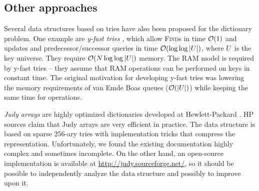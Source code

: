 \subsection{Other approaches}
Several data structures based on tries have also been proposed for the
dictionary problem. One example are \emph{y-fast tries} \cite{y-fast},
which allow \textsc{Find}s in time $\mathcal{O}(1)$ and updates and predecessor/successor
queries in time $\mathcal{O}(\log\log |U|)$, where $U$~is the key universe. They require
$\mathcal{O}(N \log\log |U|)$ memory.
The RAM model is required by y-fast tries -- they assume that RAM operations
can be performed on keys in constant time.
The original motivation for developing y-fast tries was lowering the memory
requirements of van Emde Boas queues ($\mathcal{O}(|U|)$) while keeping the same time
for operations.

\emph{Judy arrays} are highly optimized dictionaries developed at
Hewlett-Packard \cite{judy-shop-manual, judy-patent}.
HP sources claim that Judy arrays are very efficient in practice.
The data structure is based on sparse 256-ary tries with implementation tricks
that compress the representation.
Unfortunately, we found the existing documentation highly complex and sometimes
incomplete. On the other hand, an open-source implementation is available
at \url{http://judy.sourceforge.net/}, so it should be possible to independently
analyze the data structure and possibly to improve upon it.
